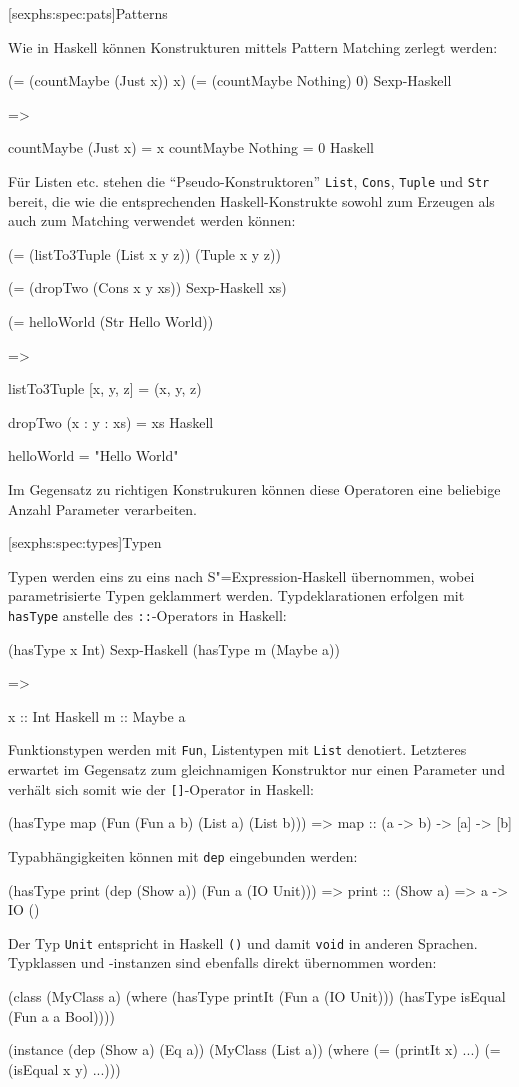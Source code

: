 \documentclass[11pt, a4paper, bibgerm]{scrbook}
\newcommand\icode[1]{\lstinline?#1?}
\newcommand\lsubsection{}
\newcommand{\sexp}{S"=Expression}
\begin{document}
\lsubsection[sexphs:spec:pats]{Patterns}

Wie in Haskell können Konstrukturen mittels Pattern Matching zerlegt
werden:
\begin{code}
(= (countMaybe (Just x)) x)
(= (countMaybe Nothing)  0)      Sexp-Haskell

=>

countMaybe (Just x) = x
countMaybe Nothing  = 0          Haskell
\end{code}
Für Listen etc. stehen die ``Pseudo-Konstruktoren'' \icode{List},
\icode{Cons}, \icode{Tuple} und \icode{Str} bereit, die wie die
entsprechenden Haskell-Konstrukte sowohl zum Erzeugen als auch zum
Matching verwendet werden können:
\begin{code}
(= (listTo3Tuple (List x y z)) 
   (Tuple x y z))

(= (dropTwo (Cons x y xs))             Sexp-Haskell
  xs)

(= helloWorld (Str Hello World))

=>

listTo3Tuple [x, y, z] = (x, y, z)

dropTwo (x : y : xs) = xs              Haskell

helloWorld = "Hello World"
\end{code}
Im Gegensatz zu richtigen Konstrukuren können diese Operatoren eine
beliebige Anzahl Parameter verarbeiten.

\lsubsection[sexphs:spec:types]{Typen}

Typen werden eins zu eins nach \sexp{}-Haskell übernommen, wobei
parametrisierte Typen geklammert werden. Typdeklarationen erfolgen
mit \icode{hasType} anstelle des \icode{::}-Operators in Haskell:
\begin{code}
(hasType x Int)
                                      Sexp-Haskell
(hasType m (Maybe a))

=>

x :: Int
                                      Haskell
m :: Maybe a
\end{code}
Funktionstypen werden mit \icode{Fun}, Listentypen mit \icode{List}
denotiert. Letzteres erwartet im Gegensatz zum gleichnamigen
Konstruktor nur einen Parameter und verhält sich somit wie der
\icode{[]}-Operator in Haskell:
\begin{code}
(hasType map (Fun (Fun a b) (List a) (List b)))
=>
map :: (a -> b) -> [a] -> [b]                  
\end{code}
Typabhängigkeiten können mit \icode{dep} eingebunden werden:
\begin{code}
(hasType print (dep (Show a)) (Fun a (IO Unit)))
=>
print :: (Show a) => a -> IO ()
\end{code}
Der Typ \icode{Unit} entspricht in Haskell \icode{()} und damit \icode{void}
in anderen Sprachen. Typklassen und -instanzen sind ebenfalls direkt
übernommen worden:
\begin{code}
(class 
  (MyClass a)
  (where
    (hasType printIt (Fun a (IO Unit)))
    (hasType isEqual (Fun a a Bool))))

(instance (dep (Show a) (Eq a))
  (MyClass (List a))
  (where
    (= (printIt x)   ...)
    (= (isEqual x y) ...)))
\end{code}
\end{document}
